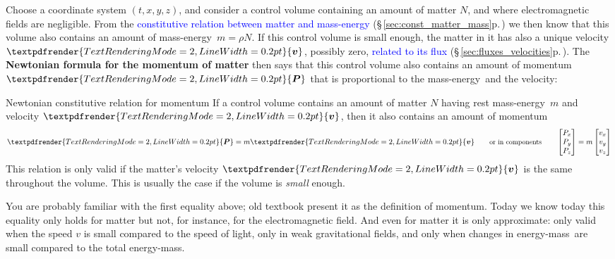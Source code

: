 \documentclass[a4paper,12pt,%
onecolumn,oneside,%
british%
]{memoir}
\renewcommand*{\bm}[1]{\textpdfrender{TextRenderingMode=2,LineWidth=0.2pt}{\boldsymbol{#1}}}
\renewcommand*{\P}{\mathrm{P}}%
\renewcommand*{\|}[1][]{\nonscript\:#1\vert\nonscript\:\mathopen{}}
\newcommand*{\sect}{\S}%
\renewcommand*{\autoref}[3][\sect\,\ref]{\textcolor{blue}{#3} {\color{blue}\scriptsize(\faIcon[regular]{eye}\;#1{#2}\;p.\,\pageref{#2})}}
\newcommand*{\energym}{energy-mass}
\newcommand*{\masse}{mass-energy}
\newcommand*{\yv}{\bm{v}}
\newcommand*{\yN}{N}
\newcommand*{\yrho}{\rho}
\newcommand*{\ym}{m}%
\newcommand*{\yP}{\bm{P}}
\begin{document}
Choose a coordinate system $(t,x,y,z)$, and consider a control volume containing an amount of matter $\yN$, and where electromagnetic fields are negligible. From the \autoref{sec:const_matter_mass}{constitutive relation between matter and \masse} we then know that this volume also contains an amount of \masse\ $\ym=\yrho\yN$. If this control volume is small enough, the matter in it has also a unique velocity $\yv$, possibly zero, \autoref{sec:fluxes_velocities}{related to its flux}. The \textbf{Newtonian formula for the momentum of matter} then says that this control volume also contains an amount of momentum $\yP$ that is proportional to the \masse\ and the velocity:
%
\begin{definition}{Newtonian constitutive relation for momentum}
If a control volume contains an amount of matter $\yN$ having rest \masse\ $\ym$ and velocity $\yv$, then it also contains an amount of momentum
\begin{equation}
  \label{eq:matter_momentum_Newton}
  \yP = \ym \yv
  \qquad\text{\small or in components}\qquad
  \begin{bmatrix}
    P_{x}\\P_{y}\\P_{z}
  \end{bmatrix}
  = \ym
  \begin{bmatrix}
    v_{x}\\v_{y}\\v_{z}
  \end{bmatrix}
\end{equation}
This relation is only valid if the matter's velocity $\yv$ is the same throughout the volume. This is usually the case if the volume is \emph{small} enough.
\end{definition}

You are probably familiar with the first equality above; old textbook present it as the definition of momentum. Today we know today  this equality only holds for matter but not, for instance, for the electromagnetic field. And even for matter it is only approximate: only valid when the speed $v$ is small compared to the speed of light, only in weak gravitational fields, and only when changes in \energym\ are small compared to the total \energym.
\end{document}
